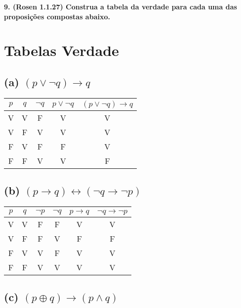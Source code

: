 \documentclass{article}
\begin{document}
\vspace{1cm}

\textbf{9. (Rosen 1.1.27) Construa a tabela da verdade para cada uma das proposições compostas abaixo.}


\section*{Tabelas Verdade}

\subsection*{(a) \( (p \lor \neg q) \rightarrow q \)}

\begin{center}
    \begin{tabular}{|c|c|c|c|c|}
        \hline
        \( p \) & \( q \) & \( \neg q \) & \( p \lor \neg q \) & \( (p \lor \neg q) \rightarrow q \) \\  
        \hline
        V & V & F & V & V \\  
        V & F & V & V & V \\  
        F & V & F & F & V \\  
        F & F & V & V & F \\  
        \hline
    \end{tabular}
\end{center}

\subsection*{(b) \( (p \rightarrow q) \leftrightarrow (\neg q \rightarrow \neg p) \)}

\begin{center}
    \begin{tabular}{|c|c|c|c|c|c|}
        \hline
        \( p \) & \( q \) & \( \neg p \) & \( \neg q \) & \( p \rightarrow q \) & \( \neg q \rightarrow \neg p \) \\  
        \hline
        V & V & F & F & V & V \\  
        V & F & F & V & F & F \\  
        F & V & V & F & V & V \\  
        F & F & V & V & V & V \\  
        \hline
    \end{tabular}
\end{center}

\subsection*{(c) \( (p \oplus q) \rightarrow (p \land q) \)}
\end{document}
